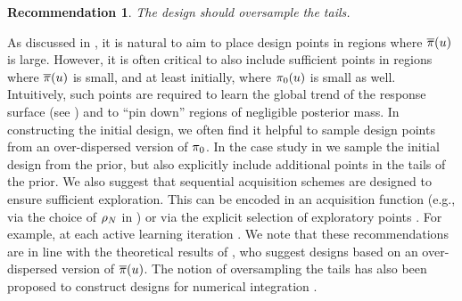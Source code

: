 \documentclass[12pt]{article}
\newtheorem{rec}{Recommendation}
\begin{document}
\begin{rec} \label{rec:oversample-tails}
The design should oversample the tails.
\end{rec}
As discussed in , it is natural to aim to place design points in regions
where $\postDensNorm(\Par)$ is large. However, it is often critical to also include sufficient
points in regions where $\postDensNorm(\Par)$ is small, and at least initially, where 
$\priorDens(\Par)$ is small as well. Intuitively, such points are required to 
learn the global trend of the response surface (see ) and to ``pin down''
regions of negligible posterior mass. In constructing the initial design, we often find it helpful
to sample design points from an over-dispersed version of $\priorDens$. In the 
case study in  we sample the initial design from the prior, but also
explicitly include additional points in the tails of the prior. We also suggest that sequential
acquisition schemes are designed to ensure sufficient exploration. This can be encoded
in an acquisition function (e.g., via the choice of $\weightDens[\Ndesign]$ in )
or via the explicit selection of exploratory points \citep{gp_surrogates_random_exploration}.  
For example, at each active learning iteration \citet{gp_surrogates_random_exploration,FerEmulation}. 
We note that these recommendations are in line with the theoretical results of \citet{StuartTeck2}, who 
suggest designs based on an over-dispersed version of $\postDensNorm(\Par)$.
The notion of oversampling the tails has also been proposed to construct designs
for numerical integration \citep{briol2017sampling}.
\end{document}
